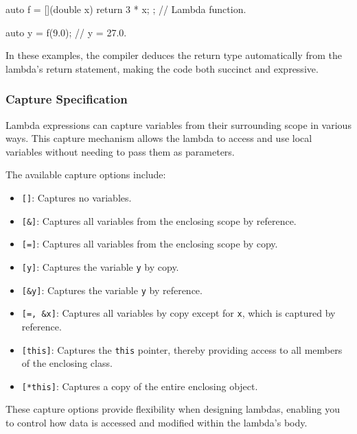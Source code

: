 \vspace{-0.5em}

\begin{codeblock}[language=C++]
auto f = [](double x) { return 3 * x; }; // Lambda function.

auto y = f(9.0); // y = 27.0.
\end{codeblock}

\vspace{-0.5em}

In these examples, the compiler deduces the return type automatically from the lambda's return statement, making the code both succinct and expressive.

\vspace{-0.5em}

\subsubsection{Capture Specification}

Lambda expressions can capture variables from their surrounding scope in various ways. This capture mechanism allows the lambda to access and use local variables without needing to pass them as parameters.

The available capture options include:

\begin{itemize}
    \item \texttt{[]}: Captures no variables.
    \item \texttt{[\&]}: Captures all variables from the enclosing scope by reference.
    \item \texttt{[=]}: Captures all variables from the enclosing scope by copy.
    \item \texttt{[y]}: Captures the variable \texttt{y} by copy.
    \item \texttt{[\&y]}: Captures the variable \texttt{y} by reference.
    \item \texttt{[=, \&x]}: Captures all variables by copy except for \texttt{x}, which is captured by reference.
    \item \texttt{[this]}: Captures the \texttt{this} pointer, thereby providing access to all members of the enclosing class.
    \item \texttt{[*this]}: Captures a copy of the entire enclosing object.
\end{itemize}

These capture options provide flexibility when designing lambdas, enabling you to control how data is accessed and modified within the lambda's body.

